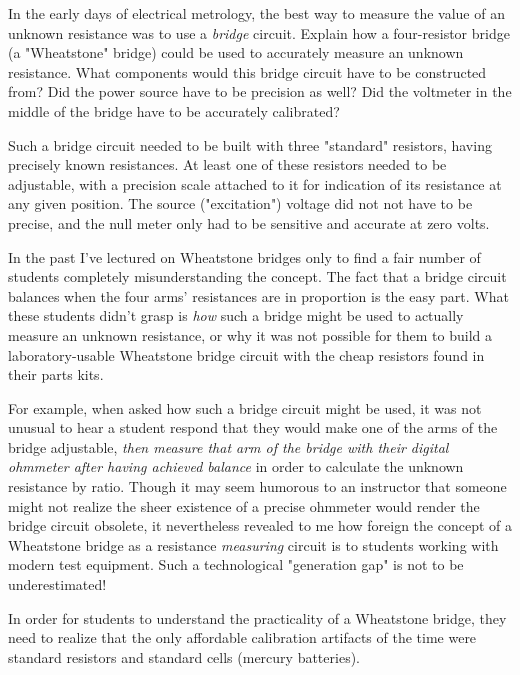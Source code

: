 

In the early days of electrical metrology, the best way to measure the value of an unknown resistance was to use a {\it bridge} circuit.  Explain how a four-resistor bridge (a "Wheatstone" bridge) could be used to accurately measure an unknown resistance.  What components would this bridge circuit have to be constructed from?  Did the power source have to be precision as well?  Did the voltmeter in the middle of the bridge have to be accurately calibrated?







Such a bridge circuit needed to be built with three "standard" resistors, having precisely known resistances.  At least one of these resistors needed to be adjustable, with a precision scale attached to it for indication of its resistance at any given position.  The source ("excitation") voltage did not not have to be precise, and the null meter only had to be sensitive and accurate at zero volts.







In the past I've lectured on Wheatstone bridges only to find a fair number of students completely misunderstanding the concept.  The fact that a bridge circuit balances when the four arms' resistances are in proportion is the easy part.  What these students didn't grasp is {\it how} such a bridge might be used to actually measure an unknown resistance, or why it was not possible for them to build a laboratory-usable Wheatstone bridge circuit with the cheap resistors found in their parts kits.

For example, when asked how such a bridge circuit might be used, it was not unusual to hear a student respond that they would make one of the arms of the bridge adjustable, {\it then measure that arm of the bridge with their digital ohmmeter after having achieved balance} in order to calculate the unknown resistance by ratio.  Though it may seem humorous to an instructor that someone might not realize the sheer existence of a precise ohmmeter would render the bridge circuit obsolete, it nevertheless revealed to me how foreign the concept of a Wheatstone bridge as a resistance {\it measuring} circuit is to students working with modern test equipment.  Such a technological "generation gap" is not to be underestimated!

In order for students to understand the practicality of a Wheatstone bridge, they need to realize that the only affordable calibration artifacts of the time were standard resistors and standard cells (mercury batteries).




